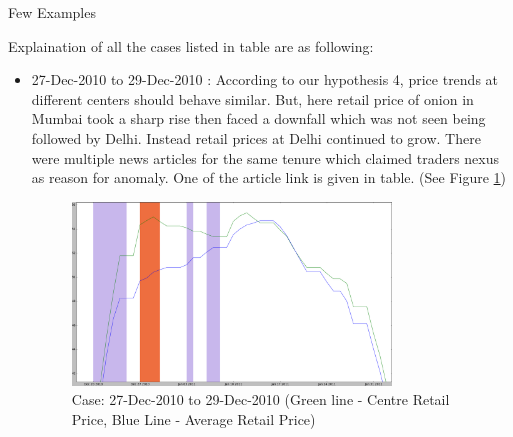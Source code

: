 \documentclass[a4paper,10pt]{article}
\begin{document}
\begin{table}[H]
\caption{Few Examples}
\label{examples}

\end{table}

Explaination of all the cases listed in table are as following:

\begin{itemize}
 \item 27-Dec-2010 to 29-Dec-2010 : According to our hypothesis 4, price trends at different centers should behave similar. But, here retail price of onion in Mumbai took a sharp rise then faced a downfall which was not seen being followed by Delhi. Instead retail prices at Delhi continued to grow. There were multiple news articles for the same tenure which claimed traders nexus as reason for anomaly. One of the article link is given in table. (See Figure \ref{fig:Mumbai_RetailvsAvg_ill1})
 
	\begin{figure}[H]
	\centering
	\includegraphics[width=0.8\textwidth]{graphs/Mumbai_RetailvsAvg_ill1.png}
	\caption{Case: 27-Dec-2010 to 29-Dec-2010 (Green line - Centre Retail Price, Blue Line - Average Retail Price)}
	\label{fig:Mumbai_RetailvsAvg_ill1}
	\end{figure}
  

\end{itemize}
\end{document}
